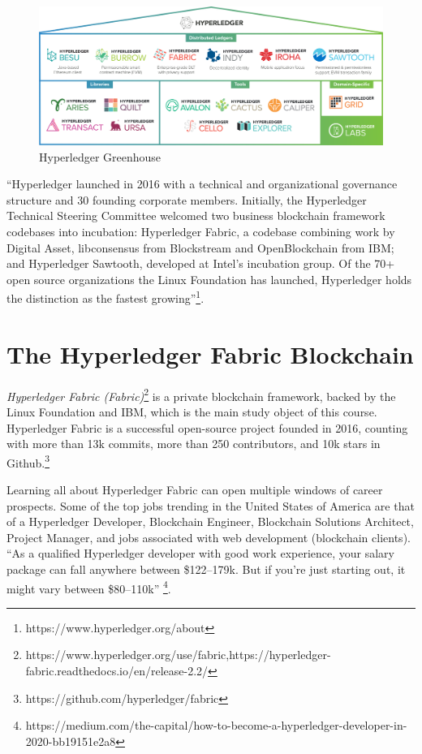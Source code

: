 \documentclass[12pt,a4paper]{article}
\theoremstyle{definition}
\begin{document}
\begin{figure}[h]

    \includegraphics[scale=0.09]{figures/hl.png}
    \centering
 \caption{Hyperledger Greenhouse}
    \label{fig:hl}
\end{figure}

``Hyperledger launched in 2016 with a technical and organizational governance structure and 30 founding corporate members. Initially, the Hyperledger Technical Steering Committee welcomed two business blockchain framework codebases into incubation: Hyperledger Fabric, a codebase combining work by Digital Asset, libconsensus from Blockstream and OpenBlockchain from IBM; and Hyperledger Sawtooth, developed at Intel’s incubation group. Of the 70+ open source organizations the Linux Foundation has launched, Hyperledger holds the distinction as the fastest growing''\footnote{https://www.hyperledger.org/about}.

\section{The Hyperledger Fabric Blockchain}
\emph{Hyperledger Fabric (Fabric)}\footnote{https://www.hyperledger.org/use/fabric,https://hyperledger-fabric.readthedocs.io/en/release-2.2/} \cite{fabric} is a private blockchain framework, backed by the Linux Foundation and IBM, which is the main study object of this course. Hyperledger Fabric is a successful open-source project founded in 2016, counting with more than 13k commits, more than 250 contributors, and 10k stars in Github.\footnote{https://github.com/hyperledger/fabric} 

Learning all about Hyperledger Fabric can open multiple windows of career prospects. Some of the top jobs trending in the United States of America are that of a Hyperledger Developer, Blockchain Engineer, Blockchain Solutions Architect, Project Manager, and jobs associated with web development (blockchain clients). ``As a qualified Hyperledger developer with good work experience, your salary package can fall anywhere between \$122–179k. But if you’re just starting out, it might vary between \$80–110k'' \footnote{https://medium.com/the-capital/how-to-become-a-hyperledger-developer-in-2020-bb19151e2a8}.
\end{document}
